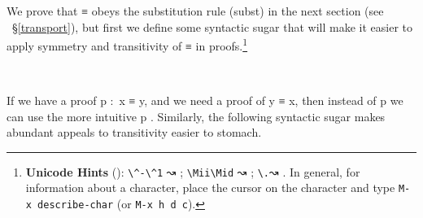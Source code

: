 We prove that \ad ≡ obeys the substitution rule (subst) in the next section (see ~\S\ref{transport}), but first we define some syntactic sugar that will make it easier to apply symmetry and transitivity of \ad ≡ in proofs.\footnote{%
\textbf{Unicode Hints} (\agdamode): \texttt{\textbackslash{}\^{}-\textbackslash{}\^{}1} ↝ ; \texttt{\textbackslash{}Mii\textbackslash{}Mid} ↝ ; \texttt{\textbackslash{}.}↝ . In general, for information about a character, place the cursor on the character and type \texttt{M-x\ describe-char} (or \texttt{M-x\ h\ d\ c}).}
\ccpad
\begin{code}
\>[1]\AgdaSpace{}%
\AgdaSymbol{:}\AgdaSpace{}%
\AgdaSymbol{\{}\AgdaSpace{}%
\AgdaSpace{}%
\AgdaSymbol{:}\AgdaSpace{}%
\AgdaSymbol{\}}\AgdaSpace{}%
\AgdaSpace{}%
\AgdaSpace{}%
\AgdaSpace{}%
\AgdaSpace{}%
\AgdaSpace{}%
\AgdaSpace{}%
\AgdaSpace{}%
\<%
\\
%
\>[1]\AgdaSpace{}%
\AgdaSpace{}%
\AgdaSymbol{=}\AgdaSpace{}%
\AgdaSpace{}%
\<%
\end{code}
\ccpad
If we have a proof \ab p \as :~\ab x \aod ≡ \ab y, and we need a proof of \ab y \aod ≡ \ab x, then instead of  \ab p we can use the more intuitive \ab p . Similarly, the following syntactic sugar makes abundant appeals to transitivity easier to stomach.
\ccpad
